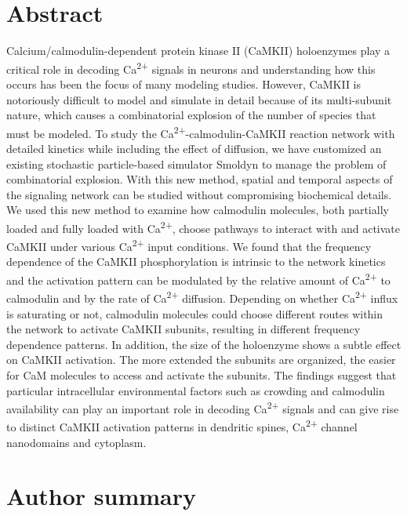 \documentclass[10pt,letterpaper]{article}
\begin{document}
\section*{Abstract}
Calcium/calmodulin-dependent protein kinase II (CaMKII) holoenzymes play a critical role in decoding Ca\textsuperscript{2+} signals in neurons and understanding how this occurs has been the focus of many modeling studies. However, CaMKII is notoriously difficult to model and simulate in detail because of its multi-subunit nature, which causes a combinatorial explosion of the number of species that must be modeled. To study the Ca\textsuperscript{2+}-calmodulin-CaMKII reaction network with detailed kinetics while including the effect of diffusion, we have customized an existing stochastic particle-based simulator Smoldyn to manage the problem of combinatorial explosion. With this new method, spatial and temporal aspects of the signaling network can be studied without compromising biochemical details. We used this new method to examine how calmodulin molecules, both partially loaded and fully loaded with Ca\textsuperscript{2+}, choose pathways to interact with and activate CaMKII under various Ca\textsuperscript{2+} input conditions. We found that the frequency dependence of the CaMKII phosphorylation is intrinsic to the network kinetics and the activation pattern can be modulated by the relative amount of Ca\textsuperscript{2+} to calmodulin and by the rate of Ca\textsuperscript{2+} diffusion. Depending on whether Ca\textsuperscript{2+} influx is saturating or not, calmodulin molecules could choose different routes within the network to activate CaMKII subunits, resulting in different frequency dependence patterns. In addition, the size of the holoenzyme shows a subtle effect on CaMKII activation. The more extended the subunits are organized, the easier for CaM molecules to access and activate the subunits. The findings suggest that particular intracellular environmental factors such as crowding and calmodulin availability can play an important role in decoding Ca\textsuperscript{2+} signals and can give rise to distinct CaMKII activation patterns in dendritic spines, Ca\textsuperscript{2+} channel nanodomains and cytoplasm.
\section*{Author summary}
\end{document}

